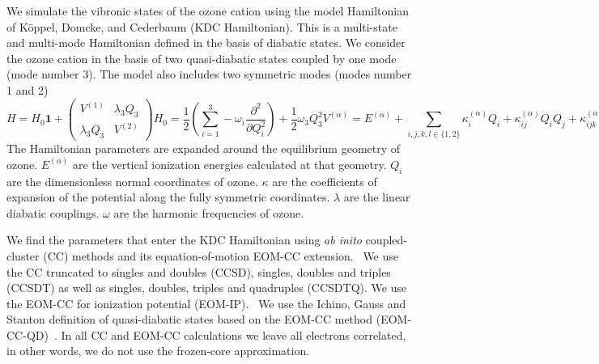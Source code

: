 \documentclass[
12pt,
a4paper,
prb,
superscriptaddress,
tightenlines,  %
]{revtex4}
\begin{document}
We simulate the vibronic states of the ozone cation using the model
Hamiltonian of K{\"o}ppel, Domcke, and Cederbaum (KDC
Hamiltonian).\cite{Cederbaum:LVC:84,KDC:81,Koppel:CIbookCh7:04} This is a
multi-state and multi-mode Hamiltonian defined in the basis of diabatic
states.  We consider the ozone cation in the basis of two quasi-diabatic
states coupled by one mode (mode number 3). The model also includes two
symmetric modes (modes number 1 and 2)
\begin{subequations}
    \begin{equation}
        H = H _0 \mathbf{1}
        +
        \begin{pmatrix}
            V ^{(1)}  & \lambda _3 Q _3\\
            \lambda _3 Q _3 & V ^{(2)}
        \end{pmatrix}
    \end{equation}
    \begin{equation}
        H _0 = 
        \frac{1}{2} \left(\sum _{i = 1}^3 
        - \omega _i \frac{\partial ^2}{\partial Q _i ^2 }\right)
        + \frac{1}{2}\omega _3 Q _3 ^2
    \end{equation}
    \begin{equation}
        V ^{(\alpha)} = 
        E ^{(\alpha)} 
        + \sum _{i,j,k,l \in \{1,2\}} 
            \kappa ^{(\alpha)} _i Q _i 
            + \kappa ^{(\alpha)} _{ij} Q _i Q _j 
            + \kappa ^{(\alpha)} _{ijk} Q _i Q _j Q _k 
            + \kappa ^{(\alpha)} _{ijkl} Q_i Q _j Q _k Q _l.
    \end{equation}
    \label{eq:KDC}
\end{subequations}
The Hamiltonian parameters are expanded around the equilibrium geometry of
ozone. $E ^{(\alpha)}$ are the vertical ionization energies calculated at that
geometry. $Q_i$ are the dimensionless normal coordinates of ozone. $\kappa$ are
the coefficients of expansion of the potential along the fully symmetric
coordinates. $\lambda$ are the linear diabatic couplings.  $\omega$ are the
harmonic frequencies of ozone.

We find the parameters that enter the KDC Hamiltonian using \emph{ab inito}
coupled-cluster (CC) methods and its equation-of-motion EOM-CC
extension.~\cite{Bartlett:CC_review:07, Krylov:EOMRev:07, Bartlett:Book:09,
Christiansen:EOMRev:11, Bartlet:EOMRev:12, Krylov:OSRev} We use the CC
truncated to singles and doubles (CCSD), singles, doubles and triples (CCSDT)
as well as singles, doubles, triples and quadruples
(CCSDTQ).\cite{Matthews:ncc:2015}  We use the EOM-CC for ionization potential
(EOM-IP).~\cite{StantonGauss:EOMIP:99} We use the Ichino, Gauss and Stanton
definition of quasi-diabatic states based on the EOM-CC method
(EOM-CC-QD)~\cite{Stanton:EOMIPdeg:09}. In all CC and EOM-CC calculations we
leave all electrons correlated, in other words, we do not use the
frozen-core approximation.
\end{document}
